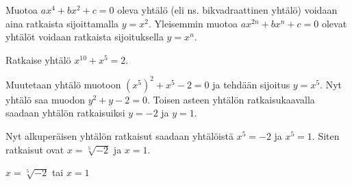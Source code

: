 Muotoa $ax^4+bx^2+c=0$ oleva yhtälö (eli ns. bikvadraattinen yhtälö) voidaan aina ratkaista sijoittamalla $y=x^2$. Yleisemmin muotoa $ax^{2n}+bx^n+c=0$ olevat yhtälöt voidaan ratkaista sijoituksella $y = x^n$.

\begin{esimerkki}
Ratkaise yhtälö $x^{10}+x^5=2$.

\begin{esimratk}
Muutetaan yhtälö muotoon $(x^5)^2+x^5-2=0$ ja tehdään sijoitus $y = x^5$. Nyt yhtälö saa muodon $y^2+y-2 = 0$. Toisen asteen yhtälön ratkaisukaavalla saadaan yhtälön ratkaisuiksi $y = -2$ ja $y = 1$.

Nyt alkuperäisen yhtälön ratkaisut saadaan yhtälöistä $x^5=-2$ ja $x^5=1$. Siten ratkaisut ovat $x = \sqrt[5]{-2}$ ja $x = 1$.
\end{esimratk}
	\begin{esimvast}
$x = \sqrt[5]{-2}$ tai $x = 1$
	\end{esimvast}
\end{esimerkki}

